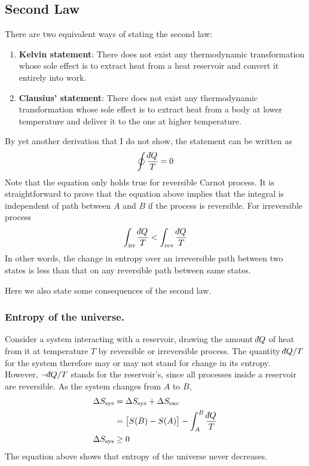 \documentclass[../../../Main.tex]{subfiles}
\begin{document}
\subsection*{Second Law}
There are two equivalent ways of stating the second law:
\begin{enumerate}
    \item \textbf{Kelvin statement}: There does not exist any thermodynamic transformation whose sole effect is to extract heat from a heat reservoir and convert it entirely into work.
    \item \textbf{Clausius' statement}: There does not exist any thermodynamic transformation whose sole effect is to extract heat from a body at lower temperature and deliver it to the one at higher temperature.
\end{enumerate}

By yet another derivation that I do not show, the statement can be written as 
\begin{equation*}
    \oint\frac{\dbar Q}{T}=0
\end{equation*}
Note that the equation only holds true for reversible Carnot process. It is straightforward to prove that the equation above implies that the integral is independent of path between $A$ and $B$ if the process is reversible. For irreversible process
\begin{equation*}
    \int_{\text{irr}}\frac{\dbar Q}{T}<\int_{\text{rev}}\frac{\dbar Q}{T}
\end{equation*}
In other words, the change in entropy over an irreversible path between two states is less than that on any reversible path between same states.

Here we also state some consequences of the second law.

\subsubsection*{Entropy of the universe.} Consider a system interacting with a reservoir, drawing the amount $\dbar Q$ of heat from it at temperature $T$ by reversible or irreversible process. The quantity $\dbar Q/T$ for the system therefore may or may not stand for change in its entropy. However, $-\dbar Q /T$ stands for the reservoir's, since all processes inside a reservoir are reversible. As the system changes from $A$ to $B$,
\begin{align*}
    \Delta S_{\text{sys}} &=\Delta S_{\text{sys}}+\Delta S_{\text{env}}\\
    &=\big[S(B)-S{(A)}\big]-\int_A^B\frac{\dbar Q}{T}\\
    \Delta S_{\text{sys}} &\geq0
\end{align*}
The equation above shows that entropy of the universe never decreases.
\end{document}
